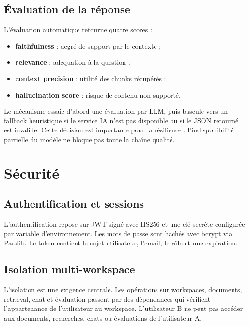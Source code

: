 \documentclass[12pt,a4paper,oneside]{report}
\begin{document}
\section{Évaluation de la réponse}
L'évaluation automatique retourne quatre scores :
\begin{itemize}
  \item \textbf{faithfulness} : degré de support par le contexte ;
  \item \textbf{relevance} : adéquation à la question ;
  \item \textbf{context precision} : utilité des chunks récupérés ;
  \item \textbf{hallucination score} : risque de contenu non supporté.
\end{itemize}

Le mécanisme essaie d'abord une évaluation par LLM, puis bascule vers un fallback heuristique si le service IA n'est pas disponible ou si le JSON retourné est invalide. Cette décision est importante pour la résilience : l'indisponibilité partielle du modèle ne bloque pas toute la chaîne qualité.

\chapter{Sécurité}

\section{Authentification et sessions}
L'authentification repose sur JWT signé avec HS256 et une clé secrète configurée par variable d'environnement. Les mots de passe sont hachés avec bcrypt via Passlib. Le token contient le sujet utilisateur, l'email, le rôle et une expiration.

\section{Isolation multi-workspace}
L'isolation est une exigence centrale. Les opérations sur workspaces, documents, retrieval, chat et évaluation passent par des dépendances qui vérifient l'appartenance de l'utilisateur au workspace. L'utilisateur B ne peut pas accéder aux documents, recherches, chats ou évaluations de l'utilisateur A.
\end{document}
